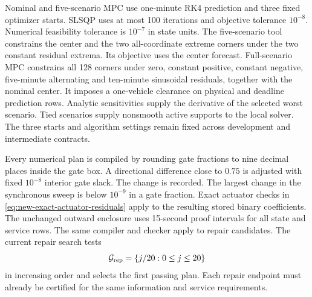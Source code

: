 \documentclass[preprint,12pt]{elsarticle}
\begin{document}
Nominal and five-scenario MPC use one-minute RK4 prediction and three
fixed optimizer starts. SLSQP uses at most 100 iterations and objective
tolerance $10^{-8}$. Numerical feasibility tolerance is $10^{-7}$ in state
units. The five-scenario tool constrains the center and the two
all-coordinate extreme corners under the two constant residual extrema.
Its objective uses the center forecast. Full-scenario MPC constrains all
128 corners under zero, constant positive, constant negative, five-minute
alternating and ten-minute sinusoidal residuals, together with the nominal
center. It imposes a one-vehicle clearance on physical and deadline
prediction rows. Analytic sensitivities supply the derivative of the
selected worst scenario. Tied scenarios supply nonsmooth active supports
to the local solver. The three starts and algorithm settings remain fixed
across development and intermediate contracts.

Every numerical plan is compiled by rounding gate fractions to nine
decimal places inside the gate box. A directional difference close to
$0.75$ is adjusted with fixed $10^{-8}$ interior gate slack. The change is
recorded. The largest change in the synchronous sweep is below $10^{-9}$
in a gate fraction. Exact actuator checks in
\eqref{eq:new-exact-actuator-residuals} apply to the resulting stored
binary coefficients. The unchanged outward enclosure uses 15-second proof
intervals for all state and service rows. The same compiler and checker
apply to repair candidates. The current repair search tests
\[
\mathcal G_{\rm rep}=\{j/20:0\le j\le20\}
\]
in increasing order and selects the first passing plan. Each repair
endpoint must already be certified for the same information and service
requirements.
\end{document}
